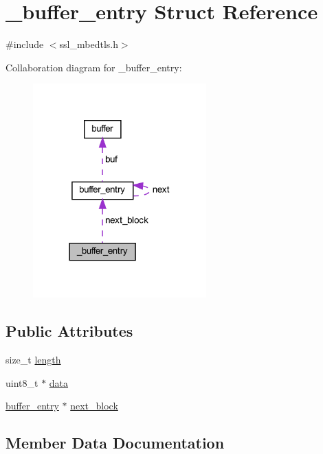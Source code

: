 \hypertarget{struct__buffer__entry}{}\section{\+\_\+buffer\+\_\+entry Struct Reference}
\label{struct__buffer__entry}


{\ttfamily \#include $<$ssl\+\_\+mbedtls.\+h$>$}



Collaboration diagram for \+\_\+buffer\+\_\+entry\+:
\nopagebreak
\begin{figure}[H]
\begin{center}
\leavevmode
\includegraphics[width=189pt]{struct__buffer__entry__coll__graph}
\end{center}
\end{figure}
\subsection*{Public Attributes}
\begin{DoxyCompactItemize}
\item 
size\+\_\+t \hyperlink{struct__buffer__entry_a05ceac1b681aed72f7cf03e90dba2923}{length}
\item 
uint8\+\_\+t $\ast$ \hyperlink{struct__buffer__entry_a925fd118a4efa1225ab3164a1027f3ca}{data}
\item 
\hyperlink{structbuffer__entry}{buffer\+\_\+entry} $\ast$ \hyperlink{struct__buffer__entry_af05ee663034cc64b90daff5934e0f55a}{next\+\_\+block}
\end{DoxyCompactItemize}


\subsection{Member Data Documentation}
\hypertarget{struct__buffer__entry_a925fd118a4efa1225ab3164a1027f3ca}{}
